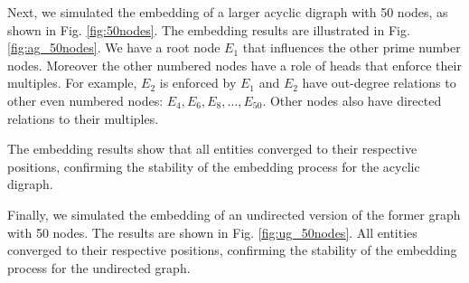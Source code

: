 \documentclass[letterpaper, 10 pt, conference]{ieeeconf}  %
\begin{document}
Next, we simulated the embedding of a larger acyclic digraph with 50 nodes, as shown in Fig. \ref{fig:50nodes}. The embedding results are illustrated in Fig. \ref{fig:ag_50nodes}. We have a root node \(E_1\) that influences the other prime number nodes. Moreover the other numbered nodes have a role of heads that enforce their multiples. For example, \(E_2\) is enforced by \(E_1\) and \(E_2\) have out-degree relations to other even numbered nodes: \(E_4, E_6, E_8, \ldots, E_{50}\). Other nodes also have directed relations to their multiples. 

The embedding results show that all entities converged to their respective positions, confirming the stability of the embedding process for the acyclic digraph.

Finally, we simulated the embedding of an undirected version of the former graph with 50 nodes. The results are shown in Fig. \ref{fig:ug_50nodes}. All entities converged to their respective positions, confirming the stability of the embedding process for the undirected graph.








\end{document}
